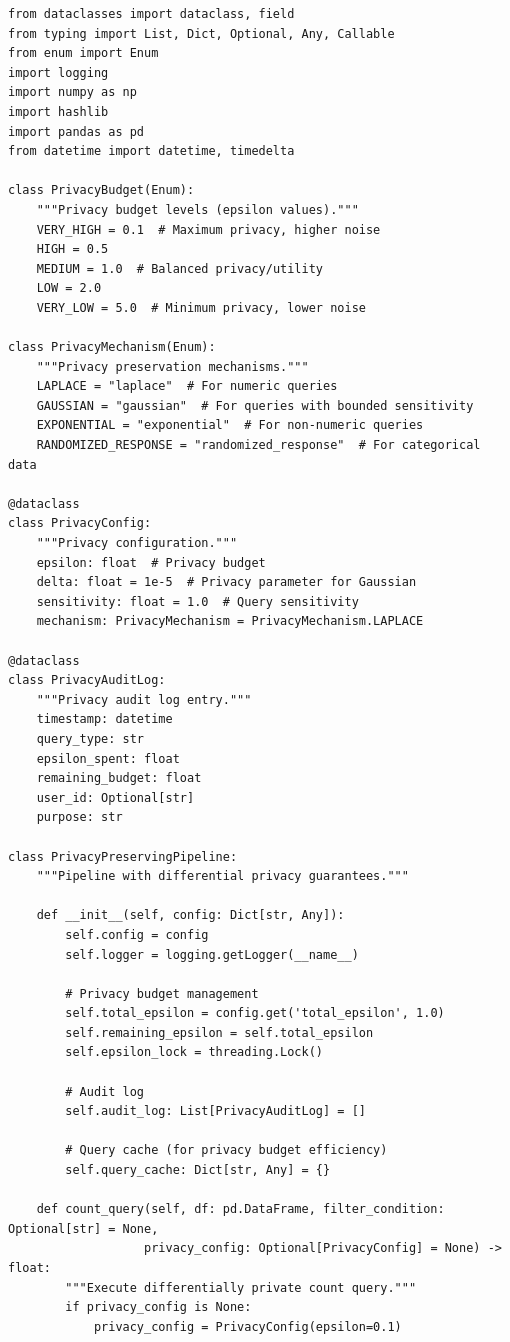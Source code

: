 \begin{lstlisting}[style=python, caption=PrivacyPreservingPipeline with Differential Privacy]
from dataclasses import dataclass, field
from typing import List, Dict, Optional, Any, Callable
from enum import Enum
import logging
import numpy as np
import hashlib
import pandas as pd
from datetime import datetime, timedelta

class PrivacyBudget(Enum):
    """Privacy budget levels (epsilon values)."""
    VERY_HIGH = 0.1  # Maximum privacy, higher noise
    HIGH = 0.5
    MEDIUM = 1.0  # Balanced privacy/utility
    LOW = 2.0
    VERY_LOW = 5.0  # Minimum privacy, lower noise

class PrivacyMechanism(Enum):
    """Privacy preservation mechanisms."""
    LAPLACE = "laplace"  # For numeric queries
    GAUSSIAN = "gaussian"  # For queries with bounded sensitivity
    EXPONENTIAL = "exponential"  # For non-numeric queries
    RANDOMIZED_RESPONSE = "randomized_response"  # For categorical data

@dataclass
class PrivacyConfig:
    """Privacy configuration."""
    epsilon: float  # Privacy budget
    delta: float = 1e-5  # Privacy parameter for Gaussian
    sensitivity: float = 1.0  # Query sensitivity
    mechanism: PrivacyMechanism = PrivacyMechanism.LAPLACE

@dataclass
class PrivacyAuditLog:
    """Privacy audit log entry."""
    timestamp: datetime
    query_type: str
    epsilon_spent: float
    remaining_budget: float
    user_id: Optional[str]
    purpose: str

class PrivacyPreservingPipeline:
    """Pipeline with differential privacy guarantees."""

    def __init__(self, config: Dict[str, Any]):
        self.config = config
        self.logger = logging.getLogger(__name__)

        # Privacy budget management
        self.total_epsilon = config.get('total_epsilon', 1.0)
        self.remaining_epsilon = self.total_epsilon
        self.epsilon_lock = threading.Lock()

        # Audit log
        self.audit_log: List[PrivacyAuditLog] = []

        # Query cache (for privacy budget efficiency)
        self.query_cache: Dict[str, Any] = {}

    def count_query(self, df: pd.DataFrame, filter_condition: Optional[str] = None,
                   privacy_config: Optional[PrivacyConfig] = None) -> float:
        """Execute differentially private count query."""
        if privacy_config is None:
            privacy_config = PrivacyConfig(epsilon=0.1)


\end{lstlisting}
